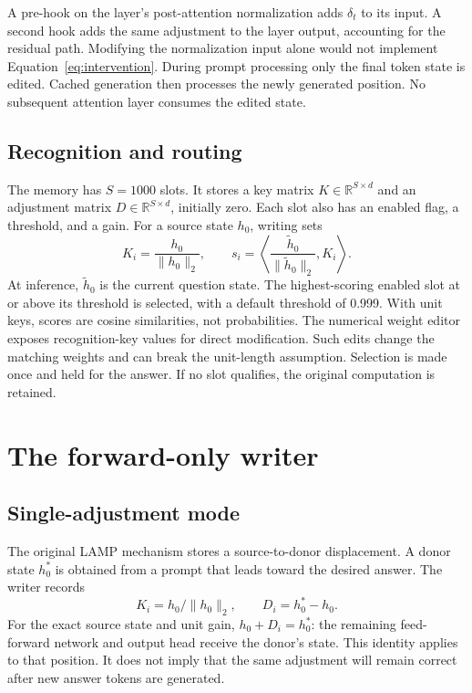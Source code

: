 \documentclass[manuscript,screen,nonacm]{acmart}
\begin{document}
A pre-hook on the layer's post-attention normalization adds $\delta_t$ to its input. A second hook adds the same adjustment to the layer output, accounting for the residual path. Modifying the normalization input alone would not implement Equation~\ref{eq:intervention}. During prompt processing only the final token state is edited. Cached generation then processes the newly generated position. No subsequent attention layer consumes the edited state.

\begin{center}
\end{center}

\subsection{Recognition and routing}
The memory has $S=1000$ slots. It stores a key matrix $K\in\mathbb{R}^{S\times d}$ and an adjustment matrix $D\in\mathbb{R}^{S\times d}$, initially zero. Each slot also has an enabled flag, a threshold, and a gain. For a source state $h_0$, writing sets
\begin{equation}
K_i=\frac{h_0}{\lVert h_0\rVert_2},
\qquad
s_i=\left\langle\frac{\widetilde h_0}{\lVert\widetilde h_0\rVert_2},K_i\right\rangle .
\end{equation}
At inference, $\widetilde h_0$ is the current question state. The highest-scoring enabled slot at or above its threshold is selected, with a default threshold of 0.999. With unit keys, scores are cosine similarities, not probabilities. The numerical weight editor exposes recognition-key values for direct modification. Such edits change the matching weights and can break the unit-length assumption. Selection is made once and held for the answer. If no slot qualifies, the original computation is retained.

\section{The forward-only writer}
\subsection{Single-adjustment mode}
The original LAMP mechanism stores a source-to-donor displacement. A donor state $h^\ast_0$ is obtained from a prompt that leads toward the desired answer. The writer records
\begin{equation}
K_i=h_0/\lVert h_0\rVert_2,\qquad D_i=h^\ast_0-h_0.
\end{equation}
For the exact source state and unit gain, $h_0+D_i=h^\ast_0$: the remaining feed-forward network and output head receive the donor's state. This identity applies to that position. It does not imply that the same adjustment will remain correct after new answer tokens are generated.
\end{document}
